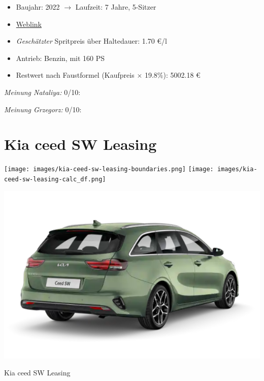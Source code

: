 \documentclass[landscape, DIV=99, 14pt]{scrartcl}
\begin{document}
\begin{itemize}
    \item Baujahr: 2022 $\rightarrow$ Laufzeit: 7 Jahre, 5-Sitzer
    \item \href{https://konfigurator.meinauto.de/kia/neuwagen/cee-d/angebote/cee-d-sporty-wagon/konfigurator/\#!/extras/spirit/8865371/3,11,27/private/109347-4167-291321/1321/61d21ce73c5db/cash-purchase/109348-8088-291322/48,0,10000,0,0,0,0,0,}{Weblink}
    \item \emph{Gesch\"atzter} Spritpreis \"uber Haltedauer: 1.70 \euro{}/l
    \item Antrieb: Benzin, mit 160 PS
    \item Restwert nach Faustformel (Kaufpreis $\times$ 19.8\%): 5002.18 \euro{}
\end{itemize}

\begin{small}
\emph{Meinung Nataliya:} 0/10: 
        
\emph{Meinung Grzegorz:} 0/10: 
\end{small}

\pagebreak


\twocolumn

\section*{Kia ceed SW Leasing}
\begin{center}
\texttt{[image: images/kia-ceed-sw-leasing-boundaries.png]}
\null
\vspace{0.5cm}
\texttt{[image: images/kia-ceed-sw-leasing-calc\_df.png]}
\end{center}

\pagebreak
\begin{center}
\includegraphics[width=0.9\columnwidth]{cars/kia-ceed-sportswagon-leasing.png}

Kia ceed SW Leasing
\end{center}
\end{document}
